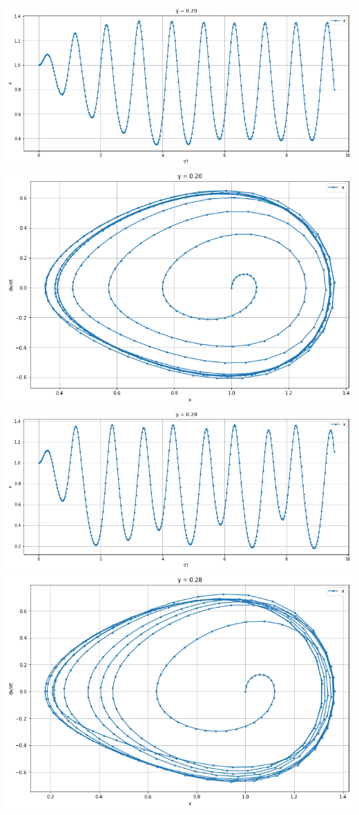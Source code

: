 \documentclass{article}
\begin{document}
\begin{center}
    \includegraphics[scale = 0.3]{201.png}
    \includegraphics[scale = 0.23]{202.png}
    \includegraphics[scale = 0.3]{281.png}
    \includegraphics[scale = 0.23]{282.png}

\end{center}
\end{document}
